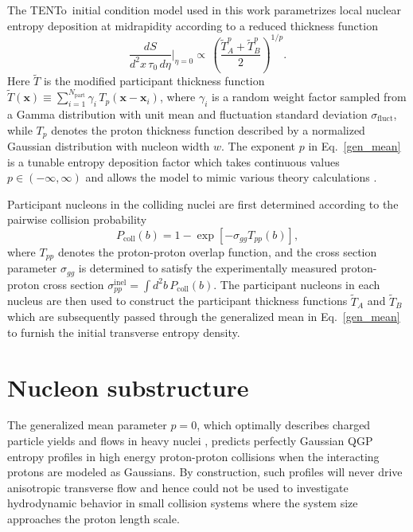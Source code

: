 \documentclass[3p,times,procedia]{elsarticle}
\newcommand{\trento}{T\raisebox{-0.3ex}{R}ENTo}
\newcommand{\sig}{\sigma^\mathrm{inel}_{pp}}
\newcommand{\T}{\tilde{T}}
\begin{document}
The \trento\ initial condition model \cite{Moreland:2014oya} used in this work parametrizes local nuclear entropy deposition at midrapidity according to a reduced thickness function
\begin{equation}
  \label{gen_mean}
  \frac{dS}{d^2x\, \tau_0\, d\eta} \bigg\vert_{\eta=0} \propto\, \left(\frac{\T_A^p + \T_B^p}{2}\right)^{1/p}.
\end{equation}
Here $\T$ is the modified participant thickness function $\T(\mathbf{x}) \equiv \sum_{i=1}^{N_\mathrm{part}} \gamma_i\, T_p(\mathbf{x} - \mathbf{x}_i)$, where $\gamma_i$ is a random weight factor sampled from a Gamma distribution with unit mean and fluctuation standard deviation $\sigma_\mathrm{fluct}$, while $T_p$ denotes the proton thickness function described by a normalized Gaussian distribution with nucleon width $w$. 
The exponent $p$ in Eq.~\eqref{gen_mean} is a tunable entropy deposition factor which takes continuous values $p \in (-\infty, \infty)$ and allows the model to mimic various theory calculations \cite{Bernhard:2016tnd}. 

Participant nucleons in the colliding nuclei are first determined according to the pairwise collision probability
\begin{equation}
  \label{collision_criteria}
  P_\mathrm{coll}(b) = 1 - \exp[-\sigma_{gg} T_{pp}(b)],
\end{equation}
where $T_{pp}$ denotes the proton-proton overlap function, and the cross section parameter $\sigma_{gg}$ is determined to satisfy the experimentally measured proton-proton cross section $\sig = \int d^2b\, P_\mathrm{coll}(b)$.
The participant nucleons in each nucleus are then used to construct the participant thickness functions $\T_A$ and $\T_B$ which are subsequently passed through the generalized mean in Eq.~\eqref{gen_mean} to furnish the initial transverse entropy density.

\section{Nucleon substructure}

The generalized mean parameter $p=0$, which optimally describes charged particle yields and flows in heavy nuclei \cite{Bernhard:2016tnd}, predicts perfectly Gaussian QGP entropy profiles in high energy proton-proton collisions when the interacting protons are modeled as Gaussians. 
By construction, such profiles will never drive anisotropic transverse flow and hence could not be used to investigate hydrodynamic behavior in small collision systems where the system size approaches the proton length scale.
\end{document}
